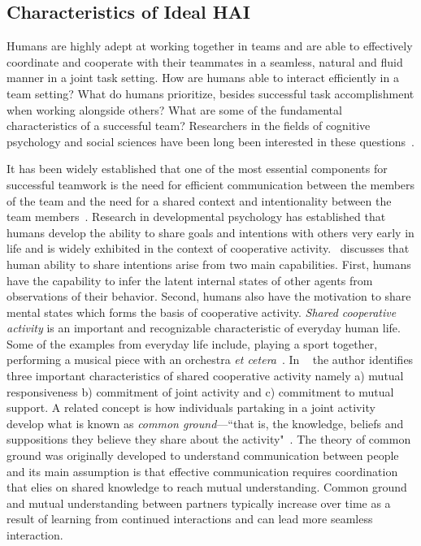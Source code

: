\documentclass[12pt]{article}
\begin{document}
\subsection{Characteristics of Ideal HAI}
Humans are highly adept at working together in teams and are able to effectively coordinate and cooperate with their teammates in a seamless, natural and fluid manner in a joint task setting. How are humans able to interact efficiently in a team setting?  What do humans prioritize, besides successful task accomplishment when working alongside others? What are some of the fundamental characteristics of a successful team? Researchers in the fields of cognitive psychology and social sciences have been long been interested in these questions~\cite{guastello1998origins,kozlowski2012dynamics, rand2013human}. 

It has been widely established that one of the most essential components for successful teamwork is the need for efficient communication between the members of the team and the need for a shared context and intentionality between the team members~\cite{tomasello2007shared}. Research in developmental psychology has established that humans develop the ability to share goals and intentions with others very early in life and is widely exhibited in the context of cooperative activity.~\cite{tomasello2007shared} discusses that human ability to share intentions arise from two main capabilities. First, humans have the capability to infer the latent internal states of other agents from observations of their behavior. Second, humans also have the motivation to share mental states which forms the basis of cooperative activity. \textit{Shared cooperative activity} is an important and recognizable characteristic of everyday human life. Some of the examples from everyday life include, playing a sport together, performing a musical piece with an orchestra \textit{et cetera}~\cite{bratman1992shared}. In ~\cite{bratman1992shared} the author identifies three important characteristics of shared cooperative activity namely a) mutual responsiveness b) commitment of joint activity and c) commitment to mutual support. A related concept is how individuals partaking in a joint activity develop what is known as \textit{common ground}---``that is, the knowledge, beliefs and suppositions they believe they share about the activity"~\cite{clark1996using}. The theory of common ground was originally developed to understand communication between people and its main assumption is that effective communication requires coordination that elies on shared knowledge to reach mutual understanding.  Common ground and mutual understanding between partners typically increase over time as a result of learning from continued interactions and can lead more seamless interaction.
\end{document}

